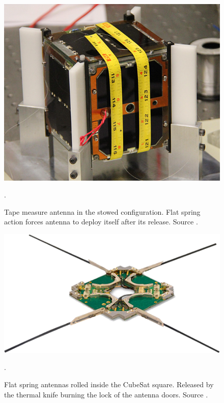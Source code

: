 \begin{figure}[H]
    \centering
    \includegraphics[width=0.5\paperwidth]{img/4/m-cubed.jpg}
    \caption{Tape measure antenna in the stowed configuration. Flat spring action forces antenna to deploy itself after its release. Source \cite{m_cubed}.}.
    \label{m_cubed}
\end{figure}

\begin{figure}[H]
    \centering
    \includegraphics[width=0.5\paperwidth]{img/4/isis_dipole.png}
    \caption{Flat spring antennas rolled inside the CubeSat square. Released by the thermal knife burning the lock of the antenna doors. Source \cite{isis_dipole_antenna}.}.
    \label{isis_dipole_antenna}
\end{figure}


